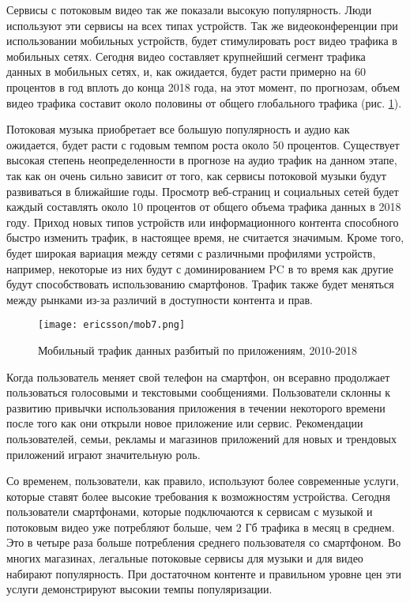 Сервисы с потоковым видео так же показали высокую популярность. Люди используют эти сервисы на всех типах устройств. Так же видеоконференции при использовании мобильных устройств, будет стимулировать рост видео трафика в мобильных сетях. Сегодня видео составляет крупнейший сегмент трафика данных в мобильных сетях, и, как ожидается, будет расти примерно на 60 процентов в год вплоть до конца 2018 года, на этот момент, по прогнозам, объем видео трафика составит около половины от общего глобального трафика (рис. \ref{img1:mob7}).

Потоковая музыка приобретает все большую популярность и аудио как ожидается, будет расти с годовым темпом роста около 50 процентов. Существует высокая степень неопределенности в прогнозе на аудио трафик на данном этапе, так как он очень сильно зависит от того, как сервисы потоковой музыки будут развиваться в ближайшие годы.
Просмотр веб-страниц и социальных сетей будет каждый составлять около 10 процентов от общего объема трафика данных в 2018 году.
Приход новых типов устройств или информационного контента способного быстро изменить трафик, в настоящее время, не считается значимым. Кроме того, будет широкая вариация между сетями с различными профилями устройств, например, некоторые из них будут с доминированием PC в то время как другие будут способствовать использованию смартфонов. Трафик также будет меняться между рынками из-за различий в доступности контента и прав.

\begin{figure} [h]
  \center
\texttt{[image: ericsson/mob7.png]}
  \caption{Мобильный трафик данных разбитый по приложениям, 2010-2018 \cite{ericsson}}
  \label{img1:mob7}
\end{figure}

Когда пользователь меняет свой телефон на смартфон, он всеравно продолжает пользоваться голосовыми и текстовыми сообщениями. Пользователи склонны к развитию привычки использования приложения в течении некоторого времени после того как они открыли новое приложение или сервис. Рекомендации пользователей, семьи, рекламы и магазинов приложений для новых и трендовых приложений играют значительную роль. 

Со временем, пользователи, как правило, используют более современные услуги, которые ставят более высокие требования к возможностям устройства. Сегодня пользователи смартфонами, которые подключаются к сервисам с музыкой и потоковым видео уже потребляют больше, чем 2 Гб трафика в месяц в среднем. Это в четыре раза больше потребления среднего пользователя со смартфоном. Во многих магазинах, легальные потоковые сервисы для музыки и для видео набирают популярность. При достаточном контенте и правильном уровне цен эти услуги демонстрируют высокии темпы популяризации.

